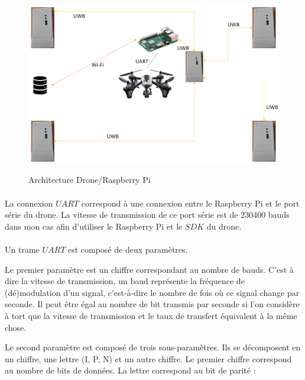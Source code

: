         \begin{figure}[H]
            \centering
        	\begin{frame}{\includegraphics[width=1\textwidth]{image/architectureDrone.png}}
        	\end{frame}
        	\caption{\label{fig:archiDrone}Architecture Drone/Raspberry Pi}
        \end{figure}
        
        \paragraph*{}
        La connexion $UART$\cite{uart} correspond à une connexion entre le Raspberry Pi et le port série du drone. La vitesse de transmission de ce port série est de 230400 bauds dans mon cas afin d'utiliser le Raspberry Pi et le $SDK$ du drone.
        
        \paragraph*{}
        Un trame $UART$ est composé de deux paramètres.
        
        Le premier paramètre est un chiffre correspondant au nombre de bauds\cite{baud}. C'est à dire la vitesse de transmission, un baud représente la fréquence de (dé)modulation d'un signal, c'est-à-dire le nombre de fois où ce signal change par seconde. Il peut être égal au nombre de bit transmis par seconde si l'on considère à tort que la vitesse de transmission et le taux de transfert équivalent à la même chose.
        
        Le second paramètre est composé de trois sous-paramètres. Ils se décomposent en un chiffre, une lettre (I, P, N) et un autre chiffre. Le premier chiffre correspond au nombre de bits de données. La lettre correspond au bit de parité :
        

